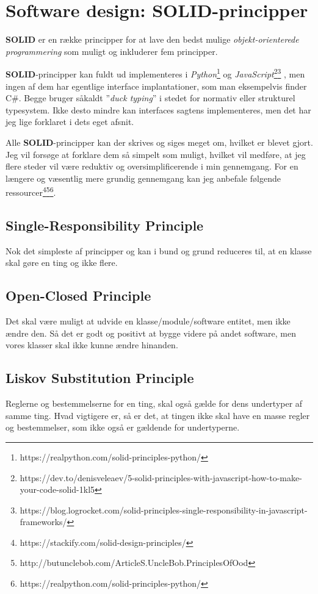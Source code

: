 \documentclass{report}
\begin{document}
\section{Software design: SOLID-principper}
\textbf{SOLID} er en række principper for at lave den bedst mulige \textit{objekt-orienterede programmering} som muligt og inkluderer fem principper.\par{}
\textbf{SOLID}-principper kan fuldt ud implementeres i \textit{Python}\footnote{https://realpython.com/solid-principles-python/} og \textit{JavaScript}\footnote{https://dev.to/denisveleaev/5-solid-principles-with-javascript-how-to-make-your-code-solid-1kl5}\footnote{https://blog.logrocket.com/solid-principles-single-responsibility-in-javascript-frameworks/} , men ingen af dem har egentlige interface implantationer, som man eksempelvis finder C\#. Begge bruger såkaldt ”\textit{duck typing}”  i stedet for normativ eller strukturel typesystem. Ikke desto mindre kan interfaces sagtens implementeres, men det har jeg lige forklaret i dets eget afsnit.\par{}
Alle \textbf{SOLID}-principper kan der skrives og siges meget om, hvilket er blevet gjort. Jeg vil forsøge at forklare dem så simpelt som muligt, hvilket vil medføre, at jeg flere steder vil være reduktiv og oversimplificerende i min gennemgang. For en længere og væsentlig mere grundig gennemgang kan jeg anbefale følgende ressourcer\footnote{https://stackify.com/solid-design-principles/}\footnote{http://butunclebob.com/ArticleS.UncleBob.PrinciplesOfOod}\footnote{https://realpython.com/solid-principles-python/}.\par{}

\subsection{Single-Responsibility Principle}
Nok det simpleste af principper og kan i bund og grund reduceres til, at en klasse skal gøre en ting og ikke flere.
\subsection{Open-Closed Principle}
Det skal være muligt at udvide en klasse/module/software entitet, men ikke ændre den. Så det er godt og positivt at bygge videre på andet software, men vores klasser skal ikke kunne ændre hinanden.
\subsection{Liskov Substitution Principle}
Reglerne og bestemmelserne for en ting, skal også gælde for dens undertyper af samme ting. Hvad vigtigere er, så er det, at tingen ikke skal have en masse regler og bestemmelser, som ikke også er gældende for undertyperne.
\end{document}
